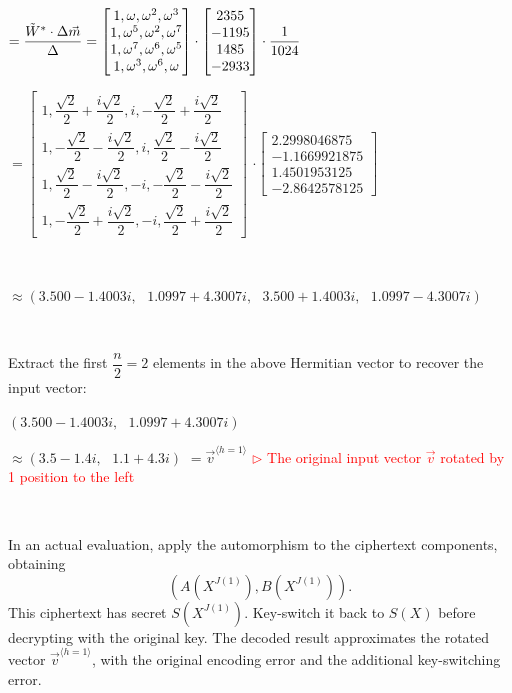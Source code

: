 $= \dfrac{\tilde W^* \cdot \Delta \vec{m}}{\Delta} = \begin{bmatrix}
1,\omega,\omega^2, \omega^3\\
1,\omega^5, \omega^{2},\omega^{7}\\
1,\omega^7, \omega^6, \omega^5\\
1,\omega^3, \omega^{6}, \omega
\end{bmatrix} \cdot \begin{bmatrix}
2355\\- 1195\\1485\\-2933
\end{bmatrix}\cdot \dfrac{1}{1024}$

$=
\begin{bmatrix}
1,\dfrac{\sqrt{2}}{2} + \dfrac{i\sqrt{2}}{2},i, -\dfrac{\sqrt{2}}{2} + \dfrac{i\sqrt{2}}{2}\\
1,-\dfrac{\sqrt{2}}{2} - \dfrac{i\sqrt{2}}{2}, i,\dfrac{\sqrt{2}}{2} - \dfrac{i\sqrt{2}}{2}\\
1,\dfrac{\sqrt{2}}{2} - \dfrac{i\sqrt{2}}{2}, -i, -\dfrac{\sqrt{2}}{2} - \dfrac{i\sqrt{2}}{2}\\
1,-\dfrac{\sqrt{2}}{2} + \dfrac{i\sqrt{2}}{2}, -i, \dfrac{\sqrt{2}}{2} + \dfrac{i\sqrt{2}}{2}
\end{bmatrix}$
$\cdot \begin{bmatrix}
2.2998046875\\-1.1669921875\\1.4501953125\\-2.8642578125
\end{bmatrix}$

$ $

$ \approx (3.500 - 1.4003i, \text{ } 1.0997 + 4.3007i,\text{ } 3.500 + 1.4003i, \text{ } 1.0997 - 4.3007i)$

$ $

Extract the first $\dfrac{n}{2} = 2$ elements in the above Hermitian vector to recover the input vector:

$(3.500 - 1.4003i, \text{ } 1.0997 + 4.3007i)$

$ \approx (3.5 - 1.4i, \text{ } 1.1 + 4.3i)$
$ = \vec{v}^{\langle h=1 \rangle}$ \textcolor{red}{  $\rhd$ The original input vector $\vec{v}$ rotated by 1 position to the left}



$ $

In an actual evaluation, apply the automorphism to the ciphertext components, obtaining
\[
(A(X^{J(1)}),B(X^{J(1)})).
\]
This ciphertext has secret $S(X^{J(1)})$. Key-switch it back to $S(X)$ before decrypting with the original key. The decoded result approximates the rotated vector $\vec v^{\langle h=1\rangle}$, with the original encoding error and the additional key-switching error.

